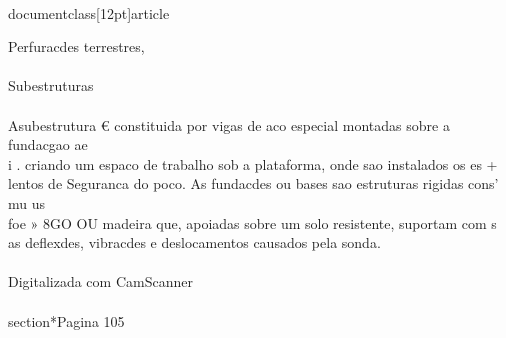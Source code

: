 \\documentclass[12pt]{article}
\begin{document}
Perfuracdes terrestres,\\
\\
Subestruturas\\
\\
Asubestrutura € constituida por vigas de aco especial montadas sobre a fundacgao ae\\
i . criando um espaco de trabalho sob a plataforma, onde sao instalados os es +\\
lentos de Seguranca do poco. As fundacdes ou bases sao estruturas rigidas cons' mu us\\
foe » 8GO OU madeira que, apoiadas sobre um solo resistente, suportam com s\\
as deflexdes, vibracdes e deslocamentos causados pela sonda.\\
\\
Digitalizada com CamScanner\\

\\section*{Pagina 105}
\end{document}
